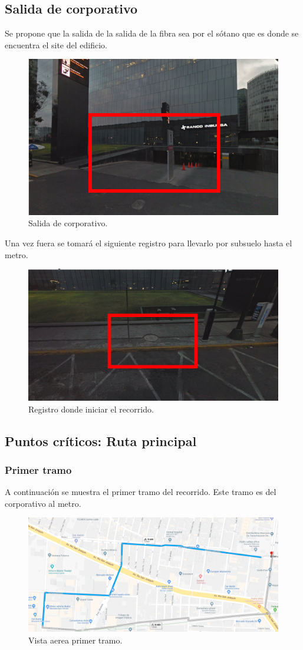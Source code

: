 \documentclass[12pt,letterpaper]{article}
\begin{document}
\subsection{Salida de corporativo}
Se propone que la salida de la salida de la fibra sea por el 
sótano que es donde se encuentra el site del edificio.
\begin{figure}[ht]
    \centering
    \includegraphics[width=.6\textwidth]{f0.png}
    \caption{Salida de corporativo.}
\end{figure}

Una vez fuera se tomará el siguiente registro para llevarlo por 
subsuelo hasta el metro.
\begin{figure}[ht]
    \centering
    \includegraphics[width=.7\textwidth]{f1.png}
    \caption{Registro donde iniciar el recorrido.}
\end{figure}

\newpage
\subsection{Puntos críticos: Ruta principal}
\subsubsection{Primer tramo}
A continuación se muestra el primer tramo del recorrido. Este 
tramo es del corporativo al metro.
\begin{figure}[ht]
    \centering
    \includegraphics[width=.8\textwidth]{f5.png}
    \caption{Vista aerea primer tramo.}
\end{figure}
\end{document}
